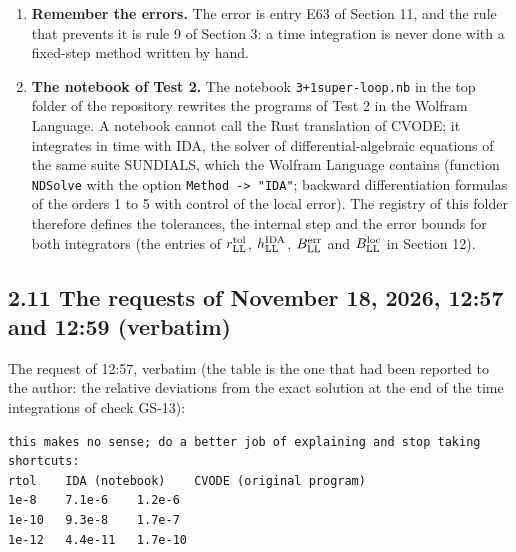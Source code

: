 \documentclass[
  10pt,
]{article}
\begin{document}
\begin{enumerate}
  SUNDIALS 7.8.0 is part of PROJECT spacetimes, in the folder
  \texttt{vendor/sundials\_rs-7.8.0} (its seven crates, unchanged, with
  the digests of its 283 files and its own provenance
  \texttt{vendor/P\_sundials\_rs-7.8.0}, .md, .tex, .pdf); the new Rust
  code of Test 2 is in the members \texttt{t2core} (\texttt{cvode.rs}),
  \texttt{t2cvode\_c} and \texttt{t2cvcmp} of the workspace
  \texttt{test2/rust}.
\item
  \textbf{Remember the errors.} The error is entry E63 of Section 11,
  and the rule that prevents it is rule 9 of Section 3: a time
  integration is never done with a fixed-step method written by hand.
\item
  \textbf{The notebook of Test 2.} The notebook
  \texttt{3+1super-loop.nb} in the top folder of the repository rewrites
  the programs of Test 2 in the Wolfram Language. A notebook cannot call
  the Rust translation of CVODE; it integrates in time with IDA, the
  solver of differential-algebraic equations of the same suite SUNDIALS,
  which the Wolfram Language contains (function \texttt{NDSolve} with
  the option \texttt{Method\ -\textgreater{}\ "IDA"}; backward
  differentiation formulas of the orders 1 to 5 with control of the
  local error). The registry of this folder therefore defines the
  tolerances, the internal step and the error bounds for both
  integrators (the entries of \(r^{\rm tol}_{\rm LL}\),
  \(h^{\rm IDA}_{\rm LL}\), \(B^{\rm err}_{\rm LL}\) and
  \(B^{\rm loc}_{\rm LL}\) in Section 12).
\end{enumerate}

\hypertarget{the-requests-of-november-18-2026-1257-and-1259-verbatim}{%
\subsection{2.11 The requests of November 18, 2026, 12:57 and 12:59
(verbatim)}\label{the-requests-of-november-18-2026-1257-and-1259-verbatim}}

The request of 12:57, verbatim (the table is the one that had been
reported to the author: the relative deviations from the exact solution
at the end of the time integrations of check GS-13):

\begin{verbatim}
this makes no sense; do a better job of explaining and stop taking shortcuts:
rtol    IDA (notebook)    CVODE (original program)
1e-8    7.1e-6    1.2e-6
1e-10   9.3e-8    1.7e-7
1e-12   4.4e-11   1.7e-10
\end{verbatim}
\end{document}
